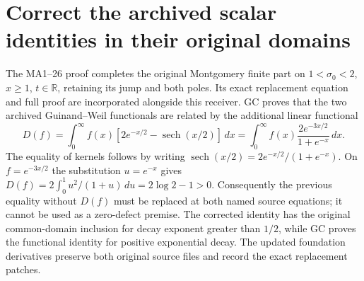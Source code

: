 \documentclass[11pt,a4paper]{article}
\providecommand{\dd}{\,d}
\begin{document}
\section{Correct the archived scalar identities in their original domains}
The MA1--26 proof completes the original Montgomery finite part on
$1<\sigma_0<2$, $x\ge1$, $t\in\mathbb R$, retaining its jump and both poles.
Its exact replacement equation and full proof are incorporated alongside
this receiver. GC proves that the two archived Guinand--Weil functionals
are related by the additional linear functional
\begin{equation}\tag{A3R13}
 D(f)=\int_0^\infty f(x)
 [2e^{-x/2}-\operatorname{sech}(x/2)]\dd x
 =\int_0^\infty f(x)\frac{2e^{-3x/2}}{1+e^{-x}}\dd x.
\end{equation}
The equality of kernels follows by writing
$\operatorname{sech}(x/2)=2e^{-x/2}/(1+e^{-x})$.
On $f=e^{-3x/2}$ the substitution $u=e^{-x}$ gives
$D(f)=2\int_0^1u^2/(1+u)\dd u=2\log2-1>0$.
Consequently the previous equality without $D(f)$ must be replaced at
both named source equations; it cannot be used as a zero-defect premise.
The corrected identity has the original common-domain inclusion for decay
exponent greater than $1/2$, while GC proves the functional identity for
positive exponential decay. The updated foundation derivatives preserve
both original source files and record the exact replacement patches.


\endgroup

\endgroup
\end{document}
